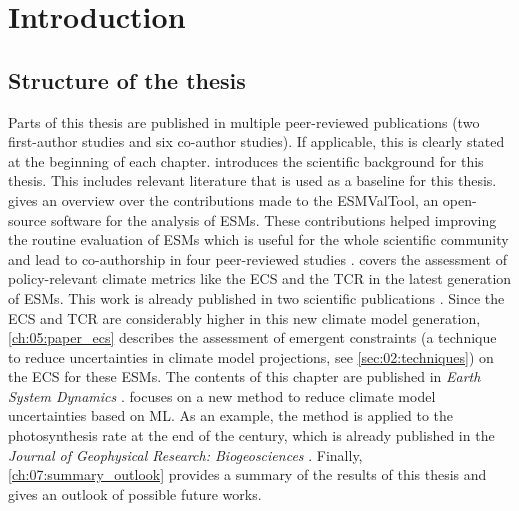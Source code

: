 


\chapter{Introduction}
\label{ch:01:introduction}


\section{Structure of the thesis}
\label{sec:01:structure}

Parts of this thesis are published in multiple peer-reviewed publications (two
first-author studies and six co-author studies). If applicable, this is clearly
stated at the beginning of each chapter. 
introduces the scientific background for this thesis. This includes relevant
literature that is used as a baseline for this thesis. 
gives an overview over the contributions made to the \ac{ESMValTool}, an
open-source software for the analysis of \acp{ESM}. These contributions helped
improving the routine evaluation of \acp{ESM} which is useful for the whole
scientific community and lead to co-authorship in four peer-reviewed studies
\autocite{Righi2020, Eyring2020, Lauer2020, Weigel2020}.
 covers the assessment of
policy-relevant climate metrics like the \ac{ECS} and the \ac{TCR} in the
latest generation of \acp{ESM}. This work is already published in two
scientific publications \autocite{Bock2020, Meehl2020}. Since the \ac{ECS} and
\ac{TCR} are considerably higher in this new climate model generation,
\cref{ch:05:paper_ecs} describes the assessment of emergent constraints (a
technique to reduce uncertainties in climate model projections, see
\vref{sec:02:techniques}) on the \ac{ECS} for these \acp{ESM}. The contents of
this chapter are published in \emph{Earth System Dynamics}
\autocite{Schlund2020a}.  focuses on a new method to
reduce climate model uncertainties based on \ac{ML}. As an example, the method
is applied to the photosynthesis rate at the end of the  century, which
is already published in the \emph{Journal of Geophysical Research:
  Biogeosciences} \autocite{Schlund2020}. Finally, \cref{ch:07:summary_outlook}
provides a summary of the results of this thesis and gives an outlook of
possible future works.